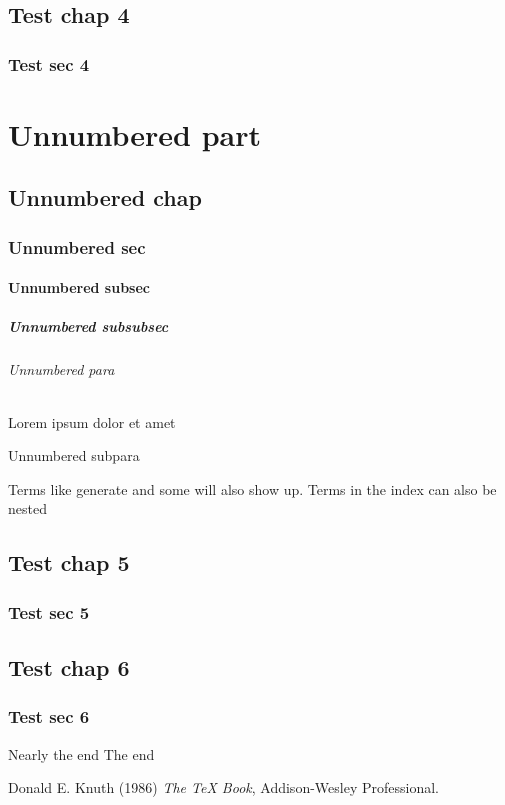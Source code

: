 \documentclass{article}
\begin{document}
    \chapter{Test chap 4}
    \section{Test sec 4}
    
    \part*{Unnumbered part}
    \chapter*{Unnumbered chap}
    \section*{Unnumbered sec}
    \subsection*{Unnumbered subsec}
    \subsubsection*{Unnumbered subsubsec}
    \paragraph*{Unnumbered para} Lorem ipsum dolor et amet
    \subparagraph*{Unnumbered subpara}
    \clearpage
    Terms like generate and some will also show up.
    \clearpage
    Terms in the index can also be nested 
    
    \appendix
    \chapter{Test chap 5}
    \section{Test sec 5}
    
    \backmatter
    \chapter{Test chap 6}
    \section{Test sec 6}
    \clearpage
    Nearly the end
    \clearpage
    The end
    \begin{thebibliography}{10}
        Donald E. Knuth (1986) \emph{The \TeX{} Book}, Addison-Wesley Professional.
    \end{thebibliography}
    \printindex
\end{document}
